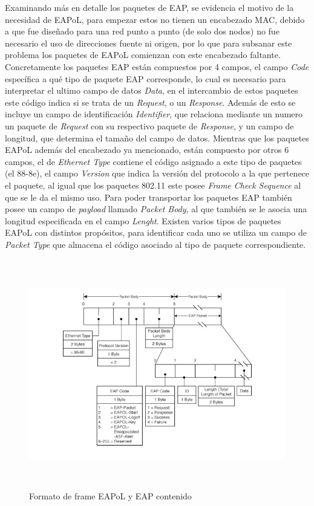 \documentclass[10pt,a4paper]{article}
\begin{document}
Examinando más en detalle los paquetes de EAP, se evidencia el motivo de la necesidad de EAPoL, para empezar estos no tienen un encabezado MAC, debido a que fue diseñado para una red punto a punto (de solo dos nodos) no fue necesario el uso de direcciones fuente ni origen, por lo que para subsanar este problema los paquetes de EAPoL comienzan con este encabezado faltante. Concretamente los paquetes EAP están compuestos por 4 campos, el campo \textit{Code} específica a qué tipo de paquete EAP corresponde, lo cual es necesario para interpretar el ultimo campo de datos \textit{Data}, en el intercambio de estos paquetes este código indica si se trata de un \textit{Request}, o un \textit{Response}. Además de esto se incluye un campo de identificación \textit{Identifier}, que relaciona mediante un numero un paquete de \textit{Request} con su respectivo paquete de \textit{Response}, y un campo de longitud, que determina el tamaño del campo de datos. Mientras que los paquetes EAPoL además del encabezado ya mencionado, están compuesto por otros 6 campos, el de \textit{Ethernet Type} contiene el código asignado a este tipo de paquetes (el 88-8e), el campo \textit{Version} que indica la versión del protocolo a la que pertenece el paquete, al igual que los paquetes 802.11 este posee \textit{Frame Check Sequence} al que se le da el mismo uso. Para poder transportar los paquetes EAP también posee un campo de \textit{payload} llamado \textit{Packet Body}, al que también se le asocia una longitud especificada en el campo \textit{Lenght}. Existen varios tipos de paquetes EAPoL con distintos propósitos, para identificar cada uno se utiliza un campo de \textit{Packet Type} que almacena el código asociado al tipo de paquete correspondiente.

\begin{figure}[H]
\centerline{\includegraphics[width=20cm,height=10cm]{images/EAPoL_and_EAP_packets.jpg}}
\caption{Formato de frame EAPoL y EAP contenido}
\end{figure}
\end{document}
